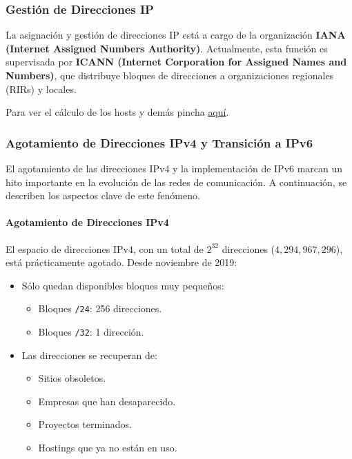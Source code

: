 \documentclass[a4paper,12pt]{article}
\begin{document}
\subsubsection*{Gestión de Direcciones IP}
La asignación y gestión de direcciones IP está a cargo de la organización \textbf{IANA (Internet Assigned Numbers Authority)}. Actualmente, esta función es supervisada por \textbf{ICANN (Internet Corporation for Assigned Names and Numbers)}, que distribuye bloques de direcciones a organizaciones regionales (RIRs) y locales.


Para  ver el cálculo de los hosts y demás pincha \href{https://github.com/ElblogdeIsmael/ElblogdeIsmael.github.io/blob/main/Subjects/Third/FR/Resumenes/ETSIIT/CalculoHosts.md}{aquí}.

\subsubsection{Agotamiento de Direcciones IPv4 y Transición a IPv6}

El agotamiento de las direcciones IPv4 y la implementación de IPv6 marcan un hito importante en la evolución de las redes de comunicación. A continuación, se describen los aspectos clave de este fenómeno.

\paragraph{Agotamiento de Direcciones IPv4}

El espacio de direcciones IPv4, con un total de \(2^{32}\) direcciones (\(4,294,967,296\)), está prácticamente agotado. Desde noviembre de 2019:
\begin{itemize}
    \item Sólo quedan disponibles bloques muy pequeños:
    \begin{itemize}
        \item Bloques \texttt{/24}: 256 direcciones.
        \item Bloques \texttt{/32}: 1 dirección.
    \end{itemize}
    \item Las direcciones se recuperan de:
    \begin{itemize}
        \item Sitios obsoletos.
        \item Empresas que han desaparecido.
        \item Proyectos terminados.
        \item Hostings que ya no están en uso.
    \end{itemize}
\end{itemize}
\end{document}
